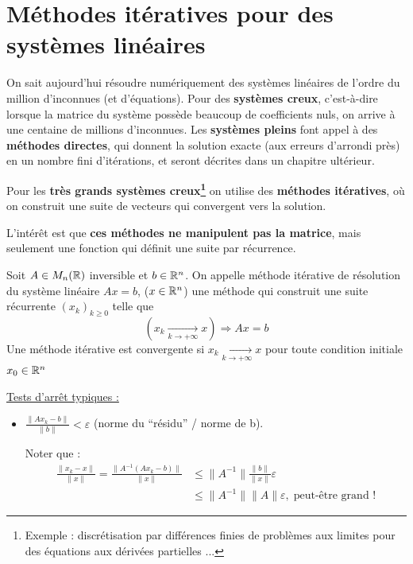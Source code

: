 \chapter{Méthodes itératives pour des systèmes linéaires}

On sait aujourd'hui résoudre numériquement des systèmes linéaires de l'ordre du million d'inconnues (et d'équations). Pour des \textbf{systèmes creux}, c'est-à-dire lorsque la matrice du système possède beaucoup de coefficients nuls, on arrive à une centaine de millions d'inconnues.
Les \textbf{systèmes pleins} font appel à des \textbf{méthodes directes}, qui donnent la solution exacte (aux erreurs d'arrondi près) en un nombre fini d'itérations, et seront décrites dans un chapitre ultérieur.

Pour les \textbf{très grands systèmes creux\footnote{Exemple : discrétisation par différences finies de problèmes aux limites pour des équations aux dérivées partielles ...}}
on utilise des \textbf{méthodes itératives}, où on construit une suite de vecteurs qui convergent vers la solution.

L'intérêt est que \textbf{ces méthodes ne manipulent pas la matrice}, mais seulement une fonction qui définit une suite par récurrence.

\begin{fdef}
    Soit $A \in M_n(\mathbb{R})$ inversible et $b \in \mathbb{R}^n$. On appelle méthode itérative de résolution du système linéaire $Ax=b$, ($x \in \mathbb{R}^n$) 
    une méthode qui construit une suite récurrente $(x_k)_{k\geq0}$
    telle que $$(x_k \underset{k\to +\infty}{\longrightarrow} x) \Rightarrow Ax=b$$
    Une méthode itérative est convergente si $x_k \underset{k\to +\infty}{\longrightarrow}x$ pour toute condition initiale $x_0 \in \mathbb{R}^n$
\end{fdef}

\underline{Tests d'arrêt typiques :}

\renewcommand{\labelitemi}{\textbullet}
\begin{itemize}
    \item $\frac{\|Ax_k - b \|}{\|b\|} < \varepsilon$ (norme du ``résidu'' / norme de b).

        Noter que : 
        \begin{align*} \frac{\|x_k-x\|}{\|x\|} 
            = \frac{\|A^{-1}(Ax_k-b)\|}{\|x\|} 
            & \leq \|A^{-1}\| \frac{\|b\|}{\|x\|}\varepsilon 
            \\ & \leq \|A^{-1}\| \|A\| \varepsilon, 
            \; \mbox{peut-être grand !}\end{align*}

\end{itemize}


